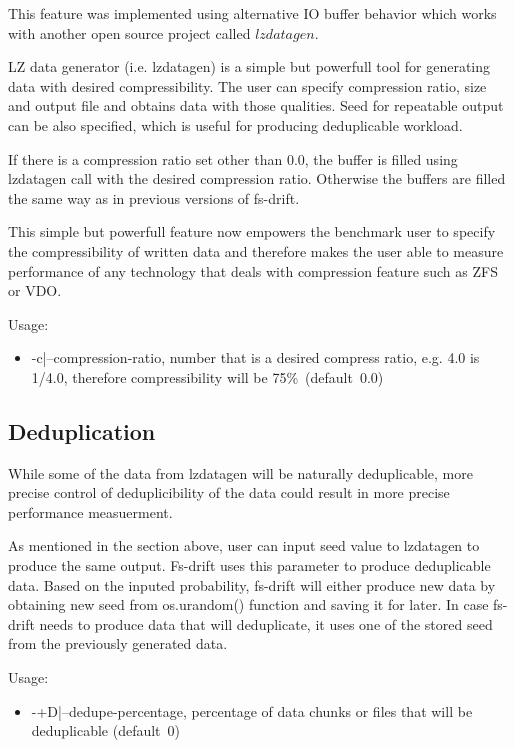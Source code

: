 \documentclass[
  color, %
  table, %
  lof,   %
  lot,   %
]{fithesis3}
\begin{document}
This feature was implemented using alternative IO buffer behavior which works with another open source project called $lzdatagen$.

LZ data generator (i.e. lzdatagen) is a simple but powerfull tool for generating data with desired compressibility. The user can specify compression ratio, size and output file and obtains data with those qualities. Seed for repeatable output can be also specified, which is useful for producing deduplicable workload.

If there is a compression ratio set other than 0.0, the buffer is filled using lzdatagen call with the desired compression ratio. Otherwise the buffers are filled the same way as in previous versions of fs-drift.

This simple but powerfull feature now empowers the benchmark user to specify the compressibility of written data and therefore makes the user able to measure performance of any technology that deals with compression feature such as ZFS or VDO.

Usage:
\begin{itemize}
    \item -c|--compression-ratio, number that is a desired compress ratio, e.g. 4.0 is 1/4.0, therefore compressibility will be 75\%~(default~0.0)
\end{itemize}


\subsection{Deduplication}
While some of the data from lzdatagen will be naturally deduplicable, more precise control of deduplicibility of the data could result in more precise performance measuerment.

As mentioned in the section above, user can input seed value to lzdatagen to produce the same output. Fs-drift uses this parameter to produce deduplicable data. Based on the inputed probability, fs-drift will either produce new data by obtaining new seed from os.urandom() function and saving it for later. In case fs-drift needs to produce data that will deduplicate, it uses one of the stored seed from the previously generated data.

Usage:
\begin{itemize}
    \item -+D|--dedupe-percentage, percentage of data chunks or files that will be deduplicable (default~0)
\end{itemize}
\end{document}
